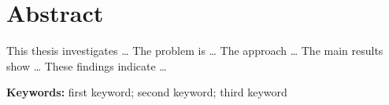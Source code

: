 \chapter{Abstract}

This thesis investigates \ldots{} The problem is \ldots{} The approach \ldots{}
The main results show \ldots{} These findings indicate \ldots{}

\par\medskip\noindent\textbf{Keywords:} first keyword; second keyword; third keyword
